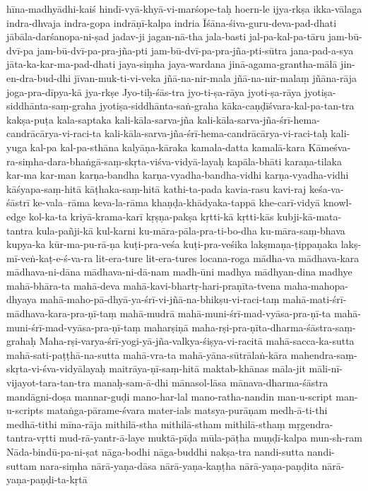 {hīna-madhyādhi-kaiś
hindī-vyā-khyā-vi-marśope-taḥ
hoern-le
ijya-rkṣa
ikka-vālaga
indra-dhvaja
indra-gopa
indrāṇī-kalpa
indria
Īśāna-śiva-guru-deva-pad-dhati
jābāla-darśanopa-ni-ṣad
jadav-ji
jagan-nā-tha
jala-basti
jal-pa-kal-pa-tāru
jam-bū-dvī-pa
jam-bū-dvī-pa-pra-jña-pti
jam-bū-dvī-pa-pra-jña-pti-sūtra
jana-pad-a-sya
jāta-ka-kar-ma-pad-dhati
jaya-siṃha
jaya-wardana
jinā-agama-grantha-mālā
jin-en-dra-bud-dhi
jīvan-muk-ti-vi-veka
jñā-na-nir-mala
jñā-na-nir-malaṃ
jñāna-rāja
joga-pra-dīpya-kā
jya-rkṣe
Jyo-tiḥ-śās-tra
jyo-ti-ṣa-rāya
jyoti-ṣa-rāya
jyotiṣa-siddhānta-saṃ-graha
jyotiṣa-siddhānta-saṅ-graha
kāka-caṇḍīśvara-kal-pa-tan-tra
kakṣa-puṭa
kala-saptaka
kali-kāla-sarva-jña
kali-kāla-sarva-jña-śrī-hema-candrācārya-vi-raci-ta
kali-kāla-sarva-jña-śrī-hema-candrācārya-vi-raci-taḥ
kali-yuga
kal-pa
kal-pa-sthāna
kalyāṇa-kāraka
kamala-datta
kamalā-kara
Kāmeśva-ra-siṃha-dara-bhaṅgā-saṃ-skṛta-viśva-vidyā-layaḥ
kapāla-bhāti
karaṇa-tilaka
kar-ma
kar-man
karṇa-bandha
karṇa-vyadha-bandha-vidhi
karṇa-vyadha-vidhi
kāśyapa-saṃ-hitā
kāṭhaka-saṃ-hitā
kathi-ta-pada
kavia-rasu
kavi-raj
keśa-va-śāstrī
ke-vala--rāma
keva-la-rāma
khaṇḍa-khādyaka-tappā
khe-carī-vidyā
knowl-edge
kol-ka-ta
kriyā-krama-karī
kṛṣṇa-pakṣa
kṛtti-kā
kṛtti-kās
kubji-kā-mata-tantra
kula-pañji-kā
kul-karni
ku-māra-pāla-pra-ti-bo-dha
ku-māra-saṃ-bhava
kupya-ka
kūr-ma-pu-rā-ṇa
kuṭi-pra-veśa
kuṭi-pra-veśika
lakṣmaṇa-ṭippaṇaka
lakṣ-mī-veṅ-kaṭ-e-ś-va-ra
lit-era-ture
lit-era-tures
locana-roga
mādha-va
mādhava-kara
mādhava-ni-dāna
mādhava-ni-dā-nam
madh-ūni
madhya
mādhyan-dina
madhye
mahā-bhāra-ta
mahā-deva
mahā-kavi-bhartṛ-hari-praṇīta-tvena
maha-mahopa-dhyaya
mahā-maho-pā-dhyā-ya-śrī-vi-jñā-na-bhikṣu-vi-raci-taṃ
mahā-mati-śrī-mādhava-kara-pra-ṇī-taṃ
mahā-mudrā
mahā-muni-śrī-mad-vyāsa-pra-ṇī-ta
mahā-muni-śrī-mad-vyāsa-pra-ṇī-taṃ
maharṣiṇā
maha-rṣi-pra-ṇīta-dharma-śāstra-saṃ-grahaḥ
Maha-rṣi-varya-śrī-yogi-yā-jña-valkya-śiṣya-vi-racitā
mahā-sacca-ka-sutta
mahā-sati-paṭṭhā-na-sutta
mahā-vra-ta
mahā-yāna-sūtrālaṅ-kāra
mahendra-saṃ-skṛta-vi-śva-vidyālayaḥ
maitrāya-ṇī-saṃ-hitā
maktab-khānas
māla-jit
māli-nī-vijayot-tara-tan-tra
manaḥ-sam-ā-dhi
mānasol-lāsa
mānava-dharma-śāstra
mandāgni-doṣa
mannar-guḍi
mano-har-lal
mano-ratha-nandin
man-u-script
man-u-scripts
mataṅga-pārame-śvara
mater-ials
matsya-purāṇam
medh-ā-ti-thi
medhā-tithi
mīna-rāja
mithilā-stha
mithilā-stham
mithilā-sthaṃ
mṛgendra-tantra-vṛtti
mud-rā-yantr-ā-laye
muktā-pīḍa
mūla-pāṭha
muṇḍī-kalpa
mun-sh-ram
Nāda-bindū-pa-ni-ṣat
nāga-bodhi
nāga-buddhi
nakṣa-tra
nandi-sutta
nandi-suttam
nara-siṃha
nārā-yaṇa-dāsa
nārā-yaṇa-kaṇṭha
nārā-yaṇa-paṇḍita
nārā-yaṇa-paṇḍi-ta-kṛtā
}
